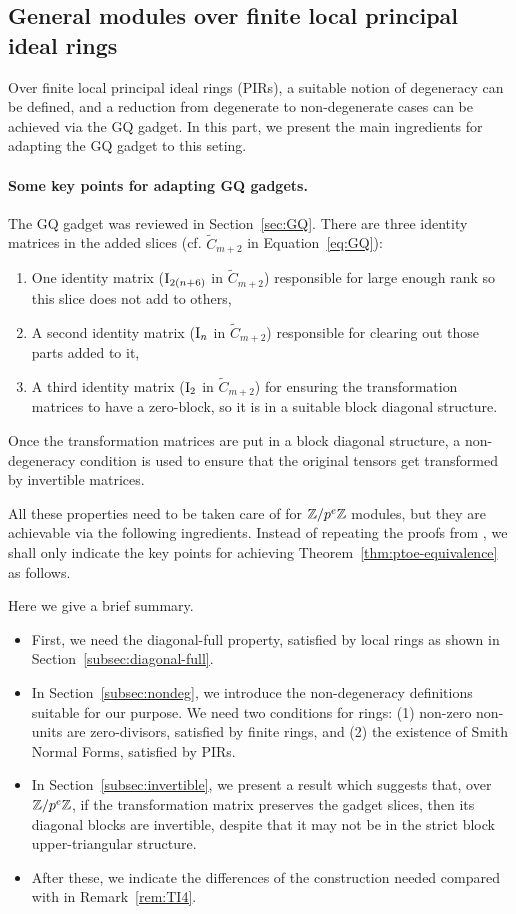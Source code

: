 \subsection{General modules over finite local principal ideal rings}\label{subsec:five-action-PIR}

Over finite local principal ideal rings (PIRs), a suitable notion of degeneracy can be defined, and a reduction from degenerate to non-degenerate cases can be achieved via the GQ gadget. In this part, we present the main ingredients for adapting the GQ gadget to this seting. 

\paragraph{Some key points for adapting GQ gadgets.} The GQ gadget was reviewed in Section~\ref{sec:GQ}. There are three identity matrices in the added slices (cf. $\tilde C_{m+2}$ in Equation~\ref{eq:GQ}): 
\begin{enumerate}
	\item One identity matrix ($\mathrm{I}_{2(n+6)}$ in $\tilde C_{m+2}$) responsible for large enough rank so this slice does not add to others,
	\item A second identity matrix ($\mathrm{I}_{n}$ in $\tilde C_{m+2}$) responsible for clearing out those parts added to it, 
	\item A third identity matrix ($\mathrm{I}_{2}$ in $\tilde C_{m+2}$) for ensuring the transformation matrices to have a zero-block, so it is in a suitable block diagonal structure.
\end{enumerate}
Once the transformation matrices are put in a block diagonal structure, a non-degeneracy condition is used to ensure that the original tensors get transformed by invertible matrices.

All these properties need to be taken care of for $\mathbb{Z}/p^e\mathbb{Z}$ modules, but they are achievable via the following ingredients. Instead of repeating the proofs from \cite{TI4}, we shall only indicate the key points for achieving Theorem~\ref{thm:ptoe-equivalence} as follows. 

Here we give a brief summary. 
\begin{itemize}
	\item First, we need the diagonal-full property, satisfied by local rings as shown in Section~\ref{subsec:diagonal-full}.
	\item In Section~\ref{subsec:nondeg}, we introduce the non-degeneracy definitions suitable for our purpose. We need two conditions for rings: (1) non-zero non-units are zero-divisors, satisfied by finite rings, and (2) the existence of Smith Normal Forms, satisfied by PIRs.
	\item In Section~\ref{subsec:invertible}, we present a result which suggests that, over $\mathbb{Z}/p^e\mathbb{Z}$, if the transformation matrix preserves the gadget slices, then its diagonal blocks are invertible, despite that it may not be in the strict block upper-triangular structure.
	\item After these, we indicate the differences of the construction needed compared with \cite{TI4} in Remark~\ref{rem:TI4}.
\end{itemize}


